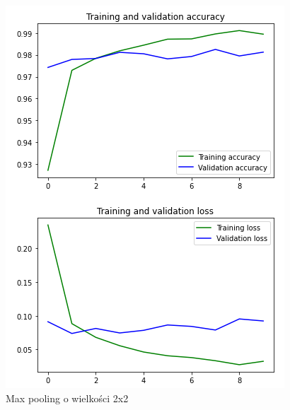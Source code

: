 \documentclass{article}
\begin{document}
\begin{figure}[!htb]
  \centering
  \includegraphics[width=\linewidth]{pooling_max_2_2.png}
  \caption{Max pooling o wielkości 2x2}
\end{figure}
\end{document}
